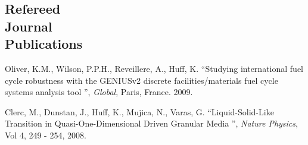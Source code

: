 \documentclass[margin,line]{resume}
\begin{document}
\begin{resume}
    \section{\mysidestyle Refereed\\Journal\\Publications}
      \begin{bibenum}
        \item Oliver, K.M., Wilson, P.P.H., Reveillere, A., Huff, K. ``Studying 
          international fuel cycle robustness with the GENIUSv2 discrete 
          facilities/materials fuel cycle systems analysis tool	'', 
          \textsl{Global}, Paris, France. 2009.
        \item Clerc, M., Dunstan, J., Huff, K., Mujica, N., Varas, G. 
          ``Liquid-Solid-Like Transition in Quasi-One-Dimensional Driven 
          Granular Media '',  \textsl{Nature Physics}, Vol 4, 249 - 254, 2008.
      \end{bibenum}

\end{resume}
\end{document}
